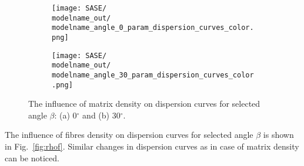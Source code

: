 \documentclass[preprint,12pt]{elsarticle}
\begin{document}
 \begin{figure} [h!]
 	\newcommand{\modelname}{SASE2_plain_weave}
 	\centering
 	\begin{subfigure}[b]{0.49\textwidth}
 		\centering
 		\texttt{[image: SASE/\\modelname\_out/\\modelname\_angle\_0\_param\_dispersion\_curves\_color.png]}
 		\caption{}
 		\label{fig:rhom0}
 	\end{subfigure}
 	\hfill
 	\begin{subfigure}[b]{0.49\textwidth}
 		\centering
 		\texttt{[image: SASE/\\modelname\_out/\\modelname\_angle\_30\_param\_dispersion\_curves\_color.png]}
 		\caption{}
 		\label{fig:rhom30}
 	\end{subfigure}
 	\caption{The influence of matrix density on dispersion curves for selected angle $\beta$: (a) 0$^{\circ}$ and (b) 30$^{\circ}$.} 
 	\label{fig:rhom}
 \end{figure}
\clearpage

The influence of fibres density on dispersion curves for selected angle $\beta$ is shown in Fig.~\ref{fig:rhof}. Similar changes in dispersion curves as in case of matrix density can be noticed.
\end{document}
